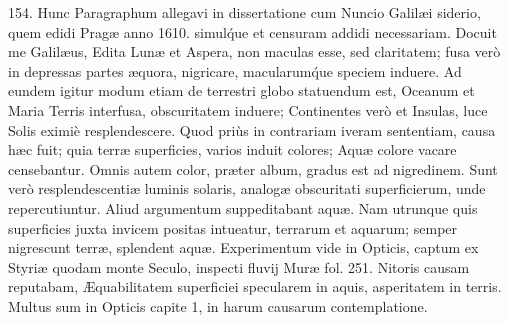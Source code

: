 \documentclass[a4paper, 11pt, oneside, polutonikogreek, german]{article}
\begin{document}
154. Hunc Paragraphum allegavi in dissertatione cum Nuncio Galilæi siderio, quem edidi Pragæ anno 1610. simul\'que et censuram addidi necessariam. Docuit me Galilæus, Edita Lunæ et Aspera, non maculas esse, sed claritatem; fusa verò in depressas partes æquora, nigricare, macularum\'que speciem induere. Ad eundem igitur modum etiam de terrestri globo statuendum est, Oceanum et Maria Terris interfusa, obscuritatem induere; Continentes verò et Insulas, luce Solis eximiè resplendescere. Quod priùs in contrariam iveram sententiam, causa hæc fuit; quia terræ superficies, varios induit colores; Aquæ colore vacare censebantur. Omnis autem color, præter album, gradus est ad nigredinem. Sunt verò resplendescentiæ luminis solaris, analogæ obscuritati superficierum, unde repercutiuntur. Aliud argumentum suppeditabant aquæ. Nam utrunque quis superficies juxta invicem positas intueatur, terrarum et aquarum; semper nigrescunt terræ, splendent aquæ. Experimentum vide in Opticis, captum ex Styriæ quodam monte Seculo, inspecti fluvij Muræ fol. 251. Nitoris causam reputabam, Æquabilitatem superficiei specularem in aquis, asperitatem in terris. Multus sum in Opticis capite 1, in harum causarum contemplatione.\hspace*{5mm}
\end{document}
